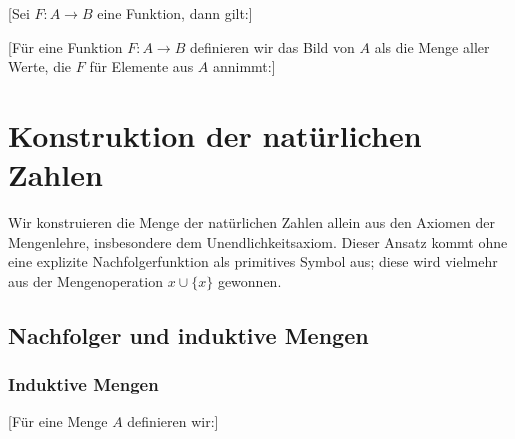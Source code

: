 \documentclass[main.tex]{subfiles}
\begin{document}
[Sei \(F\colon A\to B\) eine Funktion, dann gilt:]

\begin{tabproof}
\end{tabproof}

%
[Für eine Funktion \(F:A\to B\) definieren wir das Bild von \(A\) als die Menge aller Werte, 
die \(F\) für Elemente aus \(A\) annimmt:]

\chapter{Konstruktion der natürlichen Zahlen}

Wir konstruieren die Menge der natürlichen Zahlen allein aus den Axiomen der Mengenlehre, insbesondere dem Unendlichkeitsaxiom.  Dieser Ansatz kommt ohne eine explizite Nachfolgerfunktion als primitives Symbol aus; diese wird vielmehr aus der Mengenoperation \(x \cup \{x\}\) gewonnen.


\section{Nachfolger und induktive Mengen}

\subsection{Induktive Mengen}

[Für eine Menge \(A\) definieren wir:]
\end{document}

